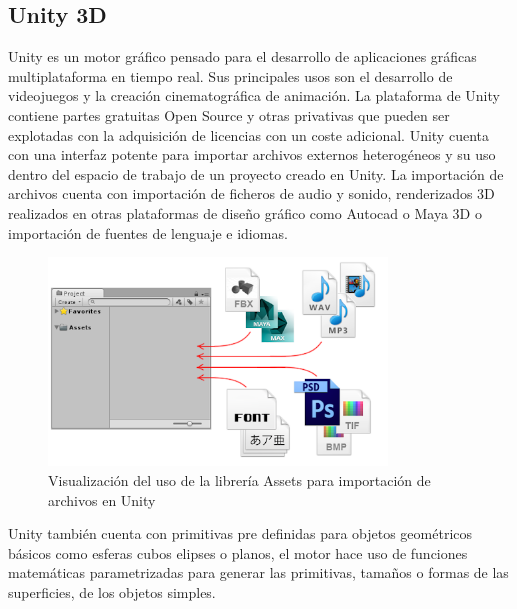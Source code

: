 \documentclass[a4paper]{book}
\begin{document}
\subsection{Unity 3D}
\label{subsec:Unity3D}

Unity es un motor gráfico pensado para el desarrollo de aplicaciones gráficas multiplataforma en tiempo
real. Sus principales usos son el desarrollo de videojuegos y la creación cinematográfica de animación.
La plataforma de Unity contiene partes gratuitas Open Source y otras privativas que pueden ser explotadas
con la adquisición de licencias con un coste adicional. Unity cuenta con una interfaz potente para importar archivos
externos heterogéneos y su uso dentro del espacio de trabajo de un proyecto creado en Unity. La importación de
archivos cuenta con importación de ficheros de audio y sonido, renderizados 3D realizados en otras plataformas de diseño gráfico como
Autocad o Maya 3D o importación de fuentes de lenguaje e idiomas.

\begin{figure}[H]
    \centering
    \includegraphics[width=9cm, keepaspectratio]{img/unity_assets.png}
    \caption{Visualización del uso de la librería Assets para importación de archivos en Unity}
    \label{unity_assets}
\end{figure}

Unity también cuenta con primitivas pre definidas para objetos geométricos básicos como esferas cubos
elipses o planos, el motor hace uso de funciones matemáticas parametrizadas para generar las primitivas, tamaños o formas de las
superficies, de los objetos simples.
\end{document}
